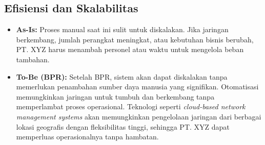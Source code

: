 \subsection{Efisiensi dan Skalabilitas}
\begin{itemize}
    \item \textbf{As-Is:} Proses manual saat ini sulit untuk diskalakan. Jika jaringan berkembang, jumlah perangkat meningkat, atau kebutuhan bisnis berubah, PT. XYZ harus menambah personel atau waktu untuk mengelola beban tambahan.
    
    \item \textbf{To-Be (BPR):} Setelah BPR, sistem akan dapat diskalakan tanpa memerlukan penambahan sumber daya manusia yang signifikan. Otomatisasi memungkinkan jaringan untuk tumbuh dan berkembang tanpa memperlambat proses operasional. Teknologi seperti \textit{cloud-based network management systems} akan memungkinkan pengelolaan jaringan dari berbagai lokasi geografis dengan fleksibilitas tinggi, sehingga PT. XYZ dapat memperluas operasionalnya tanpa hambatan.
\end{itemize}



